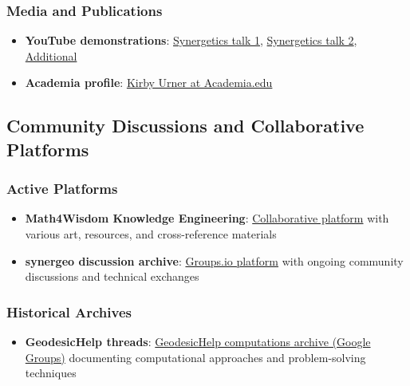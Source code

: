 \documentclass[
  10pt,
]{article}
\providecommand{\tightlist}{%
  \setlength{\itemsep}{0pt}\setlength{\parskip}{0pt}}
\begin{document}
\subsubsection{Media and Publications}\label{media-and-publications}

\begin{itemize}
\tightlist
\item
  \textbf{YouTube demonstrations}:
  \href{https://www.youtube.com/watch?v=g14mu4uWD4E}{Synergetics talk
  1}, \href{https://www.youtube.com/watch?v=i9oij02oje0}{Synergetics
  talk 2},
  \href{https://www.youtube.com/watch?v=D0M1h_gjA_w}{Additional}
\item
  \textbf{Academia profile}:
  \href{https://princeton.academia.edu/kirbyurner}{Kirby Urner at
  Academia.edu}
\end{itemize}

\subsection{Community Discussions and Collaborative
Platforms}\label{community-discussions-and-collaborative-platforms}

\subsubsection{Active Platforms}\label{active-platforms}

\begin{itemize}
\tightlist
\item
  \textbf{Math4Wisdom Knowledge Engineering}:
  \href{https://coda.io/d/_d0SvdI3KSto/Knowledge-Engineering_suxu39sp}{Collaborative
  platform} with various art, resources, and cross-reference materials
\item
  \textbf{synergeo discussion archive}:
  \href{https://groups.io/g/synergeo/topics}{Groups.io platform} with
  ongoing community discussions and technical exchanges
\end{itemize}

\subsubsection{Historical Archives}\label{historical-archives}

\begin{itemize}
\tightlist
\item
  \textbf{GeodesicHelp threads}:
  \href{https://groups.google.com/g/GeodesicHelp/}{GeodesicHelp
  computations archive (Google Groups)} documenting computational
  approaches and problem-solving techniques
\end{itemize}
\end{document}
